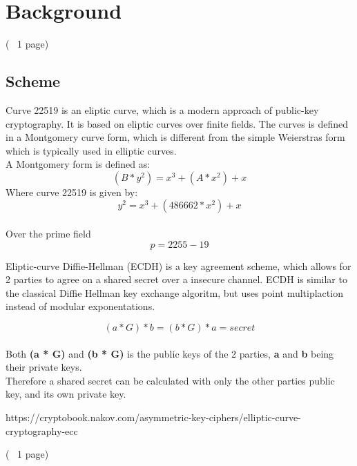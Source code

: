 \section{Background}

(~ 1 page)
\subsection{Scheme}
Curve 22519 is an eliptic curve, which is a modern approach of public-key cryptography. It is based on eliptic curves over finite fields.
The curves is defined in a Montgomery curve form, which is different from the simple Weierstras form which is typically used in elliptic curves.\\
A Montgomery form is defined as:\\
\[(B * y^2) = x^3 + (A * x^2) + x\]
Where curve 22519 is given by:\\
\[y^2 = x^3 + (486662 * x^2) + x\]\\
Over the prime field 
\[p = 2255 - 19\]

Eliptic-curve Diffie-Hellman (ECDH) is a key agreement scheme, which allows for 2 parties to agree on a shared secret over a insecure channel.
ECDH is similar to the classical Diffie Hellman key exchange algoritm, but uses point multiplaction instead of modular exponentations.

\[(a * G) * b = (b * G) * a = secret\]\\

Both \textbf{(a * G)} and \textbf{(b * G)} is the public keys of the 2 parties, \textbf{a} and \textbf{b} being their private keys.\\
Therefore a shared secret can be calculated with only the other parties public key, and its own private key.



https://cryptobook.nakov.com/asymmetric-key-ciphers/elliptic-curve-cryptography-ecc


(~ 1 page)

